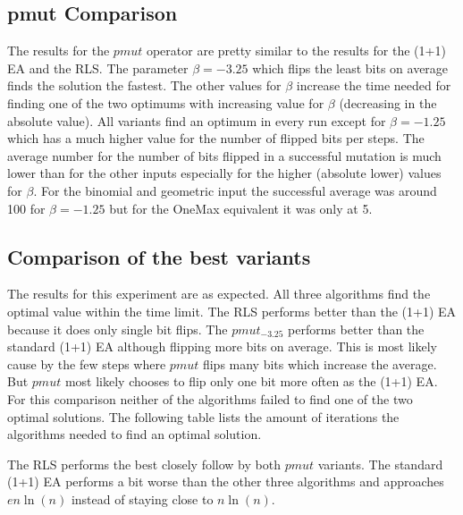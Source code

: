 \subsection{pmut Comparison}



The results for the $pmut$ operator are pretty similar to the results for the (1+1) EA and the RLS.
The parameter $\beta=-3.25$ which flips the least bits on average finds the solution the fastest.
The other values for $\beta$ increase the time needed for finding one of the two optimums with increasing value for $\beta$ (decreasing in the absolute value).
All variants find an optimum in every run except for $\beta=-1.25$ which has a much higher value for the number of flipped bits per steps.
The average number for the number of bits flipped in a successful mutation is much lower than for the other inputs especially for the higher (absolute lower) values for $\beta$.
For the binomial and geometric input the successful average was around 100 for $\beta=-1.25$ but for the OneMax equivalent it was only at 5.

\subsection{Comparison of the best variants}



The results for this experiment are as expected.
All three algorithms find the optimal value within the time limit.
The RLS performs better than the (1+1) EA because it does only single bit flips.
The $pmut_{-3.25}$ performs better than the standard (1+1) EA although flipping more bits on average.
This is most likely cause by the few steps where $pmut$ flips many bits which increase the average.
But $pmut$ most likely chooses to flip only one bit more often as the (1+1) EA.\newline
For this comparison neither of the algorithms failed to find one of the two optimal solutions.
The following table lists the amount of iterations the algorithms needed to find an optimal solution.



The RLS performs the best closely follow by both $pmut$ variants.
The standard (1+1) EA performs a bit worse than the other three algorithms and approaches $en\ln(n)$ instead of staying close to $n\ln(n)$.

